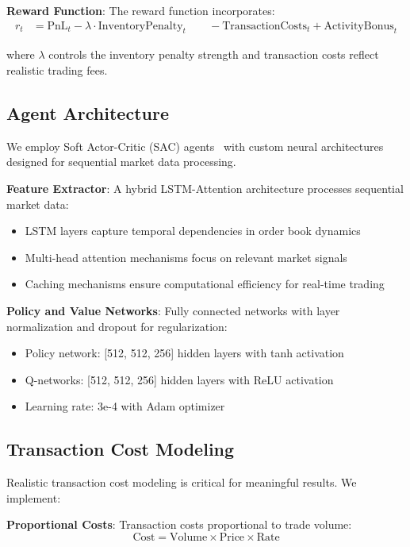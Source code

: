 \documentclass[11pt,a4paper]{article}
\begin{document}
\textbf{Reward Function}: The reward function incorporates:
\begin{align}
r_t &= \text{PnL}_{t} - \lambda \cdot \text{InventoryPenalty}_t \
&\quad - \text{TransactionCosts}_t + \text{ActivityBonus}_t
\end{align}

where $\lambda$ controls the inventory penalty strength and transaction costs reflect realistic trading fees.

\subsection{Agent Architecture}

We employ Soft Actor-Critic (SAC) agents~\cite{haarnoja2018soft} with custom neural architectures designed for sequential market data processing.

\textbf{Feature Extractor}: A hybrid LSTM-Attention architecture processes sequential market data:
\begin{itemize}
\item LSTM layers capture temporal dependencies in order book dynamics
\item Multi-head attention mechanisms focus on relevant market signals
\item Caching mechanisms ensure computational efficiency for real-time trading
\end{itemize}

\textbf{Policy and Value Networks}: Fully connected networks with layer normalization and dropout for regularization:
\begin{itemize}
\item Policy network: [512, 512, 256] hidden layers with tanh activation
\item Q-networks: [512, 512, 256] hidden layers with ReLU activation
\item Learning rate: 3e-4 with Adam optimizer
\end{itemize}

\subsection{Transaction Cost Modeling}

Realistic transaction cost modeling is critical for meaningful results. We implement:

\textbf{Proportional Costs}: Transaction costs proportional to trade volume:
$$\text{Cost} = \text{Volume} \times \text{Price} \times \text{Rate}$$
\end{document}
